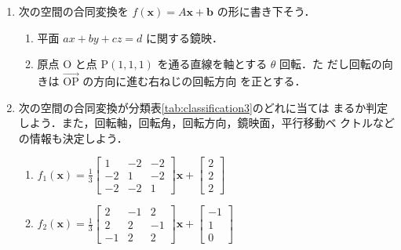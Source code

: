 \documentclass[11pt, uplatex, dvipdfmx, titlepage]{jsarticle}
\newcommand{\ds}{\displaystyle}
\theoremstyle{definition}
\begin{document}
\begin{enumerate}
  \setlength{\itemsep}{1zh}

\item 次の空間の合同変換を $f(\bm{x}) = A\bm{x} + \bm{b}$ の形に書き下そう．

  \begin{enumerate}[(1)]
  \item 平面 $ax+by+cz=d$ に関する鏡映．

  \item 原点 O と点 P$(1,1,1)$ を通る直線を軸とする $\theta$ 回転．た
    だし回転の向きは $\overrightarrow{\textrm{OP}}$ の方向に進む右ねじの回転方向
    を正とする．
  \end{enumerate}

\item 次の空間の合同変換が分類表\ref{tab:classification3}のどれに当ては
  まるか判定しよう．また，回転軸，回転角，回転方向，鏡映面，平行移動ベ
  クトルなどの情報も決定しよう．

  \vspace{1zh}

  \begin{enumerate}[(1)]
    \setlength{\itemsep}{1zh}
    
  \item $\ds f_1(\bm{x}) = \frac{1}{3} \left[
      \begin{array}{rrr}
        1 & -2 & -2\\
        -2 & 1 & -2\\
        -2 & -2 & 1
      \end{array}
    \right] \bm{x} + \left[
      \begin{array}{r}
        2\\
        2\\
        2
      \end{array}
    \right]$
    
  \item $\ds f_2(\bm{x}) = \frac{1}{3}\left[
      \begin{array}{rrr}
        2 & -1 & 2\\
        2 & 2 & -1\\
        -1 & 2 & 2
      \end{array}
    \right] \bm{x} + \left[
      \begin{array}{r}
        -1\\
        1\\
        0
      \end{array}
    \right]$


\end{enumerate}
\end{enumerate}
\end{document}
